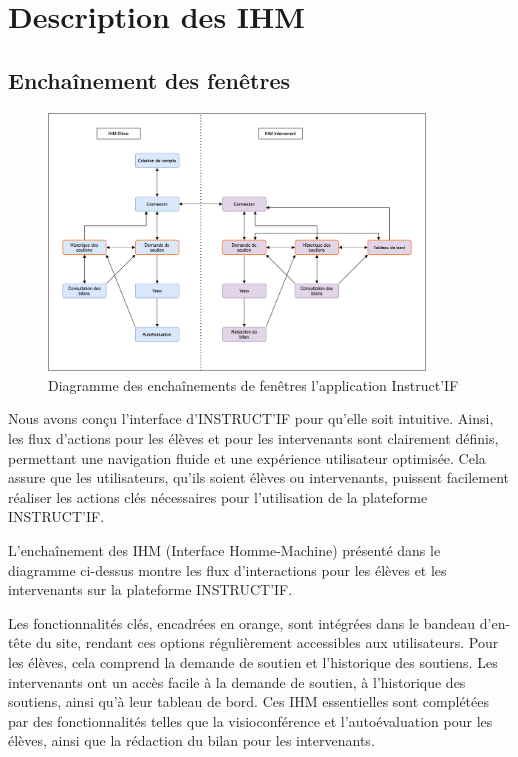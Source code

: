 \section{Description des IHM}
\subsection{Enchaînement des fenêtres}

\begin{figure}[H]
    \centering
    \includegraphics[width=10cm]{edf.png}
    \caption{Diagramme des enchaînements de fenêtres l'application Instruct'IF}
\end{figure}

Nous avons conçu l’interface d’INSTRUCT’IF pour qu’elle soit intuitive. Ainsi, les flux d'actions pour les élèves et pour les intervenants sont clairement définis, permettant une navigation fluide et une expérience utilisateur optimisée. Cela assure que les utilisateurs, qu'ils soient élèves ou intervenants, puissent facilement réaliser les actions clés nécessaires pour l'utilisation de la plateforme INSTRUCT'IF.

L'enchaînement des IHM (Interface Homme-Machine) présenté dans le diagramme ci-dessus montre les flux d'interactions pour les élèves et les intervenants sur la plateforme INSTRUCT'IF.

Les fonctionnalités clés, encadrées en orange, sont intégrées dans le bandeau d'en-tête du site, rendant ces options régulièrement accessibles aux utilisateurs. Pour les élèves, cela comprend la demande de soutien et l'historique des soutiens. Les intervenants ont un accès facile à la demande de soutien, à l'historique des soutiens, ainsi qu'à leur tableau de bord. Ces IHM essentielles sont complétées par des fonctionnalités telles que la visioconférence et l'autoévaluation pour les élèves, ainsi que la rédaction du bilan pour les intervenants.

